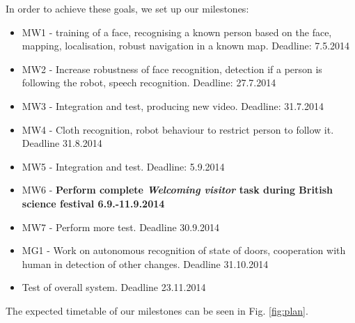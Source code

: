  In order to achieve these goals, we set up our milestones:
\begin{itemize}
\item MW1 - training of a face, recognising a known person based on the face, mapping, localisation, robust navigation in a known map. Deadline: 7.5.2014
\item MW2 - Increase robustness of face recognition, detection if a person is following the robot, speech recognition. Deadline: 27.7.2014
\item MW3 - Integration and test, producing new video. Deadline: 31.7.2014
\item MW4 - Cloth recognition, robot behaviour to restrict person to follow it. Deadline 31.8.2014
\item MW5 - Integration and test. Deadline: 5.9.2014
\item MW6 - \textbf{Perform complete \textit{Welcoming visitor} task during British science festival 6.9.-11.9.2014}
\item MW7 - Perform more test. Deadline 30.9.2014
\item MG1 - Work on autonomous recognition of state of doors, cooperation with human in detection of other changes. Deadline 31.10.2014
\item Test of overall system. Deadline 23.11.2014
\end{itemize}
The expected timetable of our milestones can be seen in Fig. \ref{fig:plan}.

